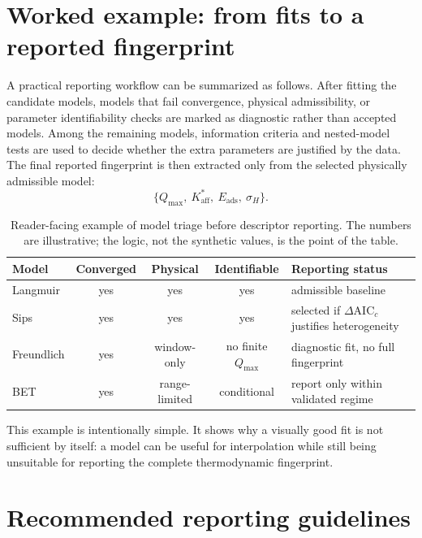 \documentclass[journal=jacsat,manuscript=article]{achemso}
\begin{document}
\section{Worked example: from fits to a reported fingerprint}
\label{sec:worked_example}

A practical reporting workflow can be summarized as follows. After fitting the
candidate models, models that fail convergence, physical admissibility, or
parameter identifiability checks are marked as diagnostic rather than accepted
models. Among the remaining models, information criteria and nested-model tests
are used to decide whether the extra parameters are justified by the data. The
final reported fingerprint is then extracted only from the selected physically
admissible model:
\[
\{Q_{\max},\ K_{\mathrm{aff}}^{\ast},\ E_{\mathrm{ads}},\ \sigma_H\}.
\]

\begin{table}[htbp]
\centering
\small
\caption{Reader-facing example of model triage before descriptor reporting. The
numbers are illustrative; the logic, not the synthetic values, is the point of
the table.}
\label{tab:worked_example_triage}
\begin{tabular}{lcccl}
\toprule
Model & Converged & Physical & Identifiable & Reporting status \\
\midrule
Langmuir & yes & yes & yes & admissible baseline \\
Sips & yes & yes & yes & selected if \(\Delta\mathrm{AIC}_c\) justifies heterogeneity \\
Freundlich & yes & window-only & no finite \(Q_{\max}\) & diagnostic fit, no full fingerprint \\
BET & yes & range-limited & conditional & report only within validated regime \\
\bottomrule
\end{tabular}
\end{table}

This example is intentionally simple. It shows why a visually good fit is not
sufficient by itself: a model can be useful for interpolation while still being
unsuitable for reporting the complete thermodynamic fingerprint.
	\section{Recommended reporting guidelines}
	\label{sec:guidelines}
\end{document}

